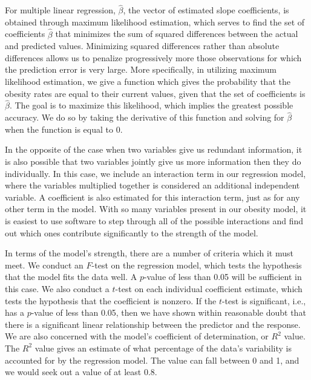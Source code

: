 \documentclass[oneside,12pt]{report}
\begin{document}
For multiple linear regression, \begin{math}\hat\beta\end{math}, the vector of estimated slope coefficients, is obtained through maximum likelihood estimation, which serves to find the set of coefficients \begin{math}\hat\beta\end{math} that minimizes the sum of squared differences between the actual and predicted values. Minimizing squared differences rather than absolute differences allows us to penalize progressively more those observations for which the prediction error is very large. More specifically, in utilizing maximum likelihood estimation, we give a function which gives the probability that the obesity rates are equal to their current values, given that the set of coefficients is \begin{math}\hat\beta\end{math}. The goal is to maximize this likelihood, which implies the greatest possible accuracy. We do so by taking the derivative of this function and solving for \begin{math}\hat\beta\end{math} when the function is equal to 0.

In the opposite of the case when two variables give us redundant information, it is also possible that two variables jointly give us more information then they do individually. In this case, we include an interaction term in our regression model, where the variables multiplied together is considered an additional independent variable. A coefficient is also estimated for this interaction term, just as for any other term in the model. With so many variables present in our obesity model, it is easiest to use software to step through all of the possible interactions and find out which ones contribute significantly to the strength of the model.

In terms of the model's strength, there are a number of criteria which it must meet. We conduct an $F$-test on the regression model, which tests the hypothesis that the model fits the data well. A $p$-value of less than 0.05 will be sufficient in this case. We also conduct a $t$-test on each individual coefficient estimate, which tests the hypothesis that the coefficient is nonzero. If the $t$-test is significant, i.e., has a $p$-value of less than 0.05, then we have shown within reasonable doubt that there is a significant linear relationship between the predictor and the response. We are also concerned with the model's coefficient of determination, or \begin{math}R^2\end{math} value. The \begin{math}R^2\end{math} value gives an estimate of what percentage of the data's variability is accounted for by the regression model. The value can fall between 0 and 1, and we would seek out a value of at least 0.8.
\end{document}
